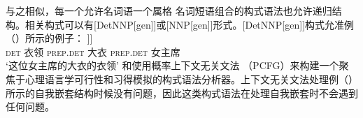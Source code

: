 与之相似，每一个允许名词语一个属格 名词短语组合的构式语法也允许递归结构。相关构式可以有[DetNNP[gen]]或[NNP[gen]]形式。[DetNNP[gen]]构式允准例（）所示的例子：
\ea
\gll [\sub{NP} des Kragens [\sub{NP} des Mantels [\sub{NP} der Vorsitzenden]]]\\
	{} \textsc{det} 衣领 {} \textsc{prep}.\textsc{det} 大衣 {} \textsc{prep}.\textsc{det} 女主席\\
\glt `这位女主席的大衣的衣领'
\z
\citet{Jurafsky96a}和\citet*{BLT2009a}使用概率上下文无关文法 （PCFG）来构建一个聚焦于心理语言学可行性和习得模拟的构式语法分析器。上下文无关文法处理例（） 所示的自我嵌套结构时候没有问题，因此这类构式语法在处理自我嵌套时不会遇到任何问题。

